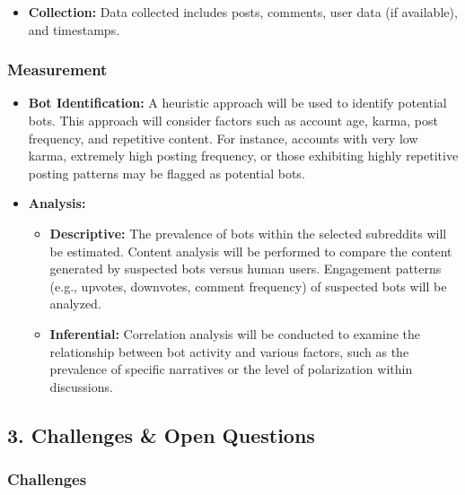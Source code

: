 \documentclass[
  letterpaper,
  DIV=11,
  numbers=noendperiod]{scrartcl}
\providecommand{\tightlist}{%
  \setlength{\itemsep}{0pt}\setlength{\parskip}{0pt}}\usepackage{longtable,booktabs,array}
\begin{document}
\begin{itemize}
\tightlist
\item
  \textbf{Collection:} Data collected includes posts, comments, user
  data (if available), and timestamps.
\end{itemize}

\subsubsection{Measurement}\label{measurement}

\begin{itemize}
\tightlist
\item
  \textbf{Bot Identification:} A heuristic approach will be used to
  identify potential bots. This approach will consider factors such as
  account age, karma, post frequency, and repetitive content. For
  instance, accounts with very low karma, extremely high posting
  frequency, or those exhibiting highly repetitive posting patterns may
  be flagged as potential bots.
\item
  \textbf{Analysis:}

  \begin{itemize}
  \tightlist
  \item
    \textbf{Descriptive:} The prevalence of bots within the selected
    subreddits will be estimated. Content analysis will be performed to
    compare the content generated by suspected bots versus human users.
    Engagement patterns (e.g., upvotes, downvotes, comment frequency) of
    suspected bots will be analyzed.
  \item
    \textbf{Inferential:} Correlation analysis will be conducted to
    examine the relationship between bot activity and various factors,
    such as the prevalence of specific narratives or the level of
    polarization within discussions.
  \end{itemize}
\end{itemize}

\subsection{3. Challenges \& Open
Questions}\label{challenges-open-questions}

\subsubsection{Challenges}\label{challenges}
\end{document}
